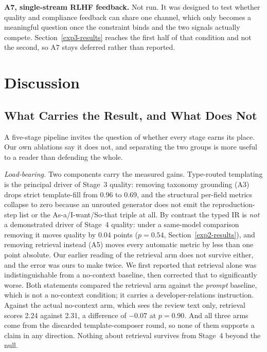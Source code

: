 \documentclass[preprint,12pt]{elsarticle}
\begin{document}
  \textbf{A7, single-stream RLHF feedback.} Not run. It was designed to test whether quality and
  compliance feedback can share one channel, which only becomes a meaningful question once the
  constraint binds and the two signals actually compete. Section~\ref{exp3-results} reaches the
  first half of that condition and not the second, so A7 stays deferred rather than reported.

\section{Discussion}\label{discussion}

\subsection{What Carries the Result, and What Does Not}\label{load-bearing}
A five-stage pipeline invites the question of whether every stage earns its place. Our own
ablations say it does not, and separating the two groups is more useful to a reader than
defending the whole.

\emph{Load-bearing.} Two components carry the measured gains. Type-routed templating is the
principal driver of Stage~3 quality: removing taxonomy grounding (A3) drops strict template-fill
from 0.96 to 0.69, and the structural per-field metrics collapse to zero because an unrouted
generator does not emit the reproduction-step list or the As-a/I-want/So-that triple at all. By
contrast the typed IR is \emph{not} a demonstrated driver of Stage~4 quality: under a same-model
comparison removing it moves quality by $0.04$ points ($p = 0.54$, Section~\ref{exp2-results}),
and removing retrieval instead (A5) moves every automatic metric by less than one point
absolute. Our earlier reading of the retrieval arm does not survive either, and the error was
ours to make twice. We first reported that retrieval alone was indistinguishable from a
no-context baseline, then corrected that to significantly worse. Both statements compared the
retrieval arm against the \emph{prompt} baseline, which is not a no-context condition; it carries
a developer-relations instruction. Against the actual no-context arm, which sees the review text
only, retrieval scores 2.24 against 2.31, a difference of $-0.07$ at $p = 0.90$. And all three
arms come from the discarded template-composer round, so none of them supports a claim in any
direction. Nothing about retrieval survives from Stage~4 beyond the null.
\end{document}
